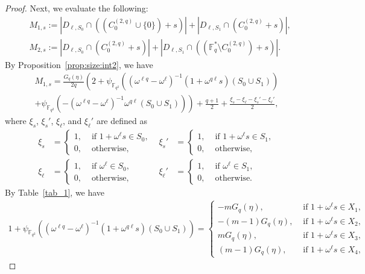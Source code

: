 \documentclass[10pt]{amsart}
\theoremstyle{definition}
\newcommand*\F{{\mathbb F}}
\begin{document}
\begin{proof}
Next, we evaluate the following:
\begin{align*}
&M_{1,s}:=|D_{\ell,S_0}\cap ((C_0^{(2,q)}\cup \{0\})+s)|+ |D_{\ell,S_1}\cap (C_0^{(2,q)}+s)|,\\
&M_{2,s}:=|D_{\ell,S_0}\cap (C_0^{(2,q)}+s)|+ |D_{\ell,S_1}\cap ((\F_q^\ast \setminus C_0^{(2,q)})+s)|.
\end{align*}
By Proposition~\ref{prop:size:int2}, we have
\begin{multline}
M_{1,s} =\frac{G_q(\eta)}{2q}\left(2+\psi_{\F_{q^2}}((\omega^{\ell q}-\omega^\ell)^{-1}(1+\omega^{q\ell} s)(S_0\cup S_1))\right.\\
\left.+\psi_{\F_{q^2}}(-(\omega^{\ell q}-\omega^\ell)^{-1}\omega^{q\ell}(S_0\cup S_1))\right) +\frac{q+1}{2}+\frac{\xi_s-\xi_{\ell}-\xi_s'-\xi_{\ell}'}{2},\label{eq:com14R}
\end{multline}
where $\xi_s$, $\xi_s'$, $\xi_\ell$, and $\xi_\ell'$ are defined as
\[
\begin{aligned}
\xi_s&=
\begin{cases}
1,& \text{ if } 1+\omega^\ell s\in S_0,\\
0,& \text{ otherwise, }
\end{cases} &
\xi_s'&=
\begin{cases}
1,& \text{ if } 1+\omega^\ell s\in S_1,\\
0,& \text{ otherwise, }
\end{cases}
\\
\xi_\ell&=
\begin{cases}
1,& \text{ if } \omega^\ell \in S_0,\\
0,& \text{ otherwise, }
\end{cases} &
\xi_\ell'&=
\begin{cases}
1,& \text{ if } \omega^\ell \in S_1,\\
0,& \text{ otherwise. }
\end{cases}
\end{aligned}
\]
By Table~\ref{tab_1}, we have
\begin{align*}
1+\psi_{\F_{q^2}}((\omega^{\ell q}-\omega^\ell)^{-1}(1+\omega^{q\ell} s)(S_0\cup S_1)) =
\begin{cases}
-mG_{q}(\eta),& \text{ if } 1+\omega^{\ell} s\in X_1,\\
-(m-1) G_{q}(\eta),& \text{ if } 1+\omega^{\ell} s\in X_2, \\
m G_{q}(\eta),& \text{ if }1+\omega^{\ell} s\in X_3,\\
(m-1) G_{q}(\eta),& \text{ if } 1+\omega^{\ell} s\in X_4,
\end{cases}

\end{align*}
\end{proof}
\end{document}
